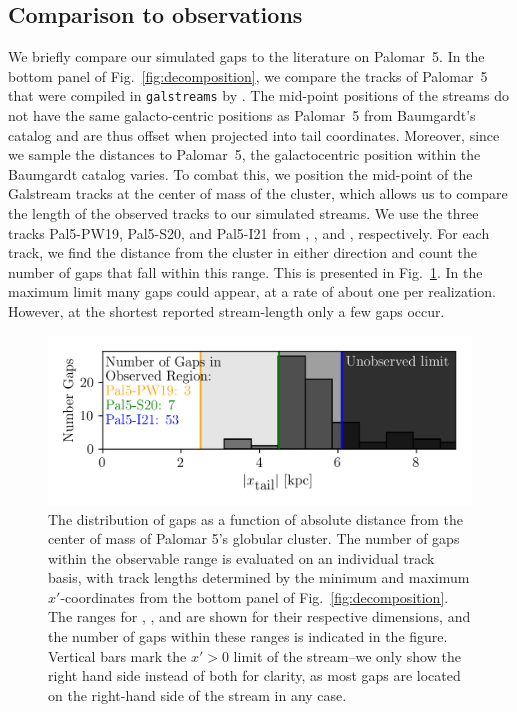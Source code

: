 \documentclass[draft]{aa}
\begin{document}
  \subsection{Comparison to observations}

    We briefly compare our simulated gaps to the literature on Palomar~5. In the bottom panel of Fig.~\ref{fig:decomposition}, we compare the tracks of Palomar~5 that were compiled in \texttt{galstreams} by \citet{2023MNRAS.520.5225M}. The mid-point positions of the streams do not have the same galacto-centric positions as Palomar~5 from Baumgardt's catalog and are thus offset when projected into tail coordinates. Moreover, since we sample the distances to Palomar~5, the galactocentric position within the Baumgardt catalog varies. To combat this, we position the mid-point of the Galstream tracks at the center of mass of the cluster, which allows us to compare the length of the observed tracks to our simulated streams. We use the three tracks Pal5-PW19, Pal5-S20, and Pal5-I21 from \citet{2019AJ....158..223P}, \citet{2020MNRAS.495.2222S}, and \citet{2021ApJ...914..123I}, respectively. For each track, we find the distance from the cluster in either direction and count the number of gaps that fall within this range. This is presented in Fig.~\ref{fig:GapsWithinSight}. In the maximum limit many gaps could appear, at a rate of about one per realization. However, at the shortest reported stream-length only a few gaps occur.
      \begin{figure}
        \centering
        \includegraphics[width=\linewidth]{GapWithinSight.png}
        \caption{The distribution of gaps as a function of absolute distance from the center of mass of Palomar 5's globular cluster. The number of gaps within the observable range is evaluated on an individual track basis, with track lengths determined by the minimum and maximum $x'$-coordinates from the bottom panel of Fig.~\ref{fig:decomposition}. The ranges for \citet{2019AJ....158..223P}, \citet{2020MNRAS.495.2222S}, and \citet{2021ApJ...914..123I} are shown for their respective dimensions, and the number of gaps within these ranges is indicated in the figure. Vertical bars mark the $x' > 0$ limit of the stream--we only show the right hand side instead of both for clarity, as most gaps are located on the right-hand side of the stream in any case. }
        \label{fig:GapsWithinSight}
      \end{figure}    
    
\end{document}
